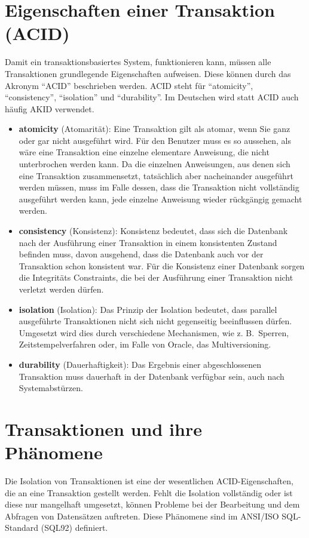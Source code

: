     \section{Eigenschaften einer Transaktion (ACID)}
      Damit ein transaktionsbasiertes System, funktionieren kann, müssen alle
      Transaktionen grundlegende Eigenschaften aufweisen. Diese können durch das Akronym
      \enquote{ACID} beschrieben werden. ACID steht für \enquote{atomicity},
     \enquote{consistency}, \enquote{isolation} und \enquote{durability}. Im
     Deutschen wird statt ACID auch häufig AKID verwendet.
      \begin{itemize}
        \item \textbf{atomicity} (Atomarität): Eine Transaktion gilt als
        atomar, wenn Sie ganz oder gar nicht ausgeführt wird. Für den
        Benutzer muss es so aussehen, als wäre eine Transaktion eine einzelne
        elementare Anweisung, die nicht unterbrochen werden kann. Da die
        einzelnen Anweisungen, aus denen sich eine Transaktion zusammensetzt,
        tatsächlich aber nacheinander ausgeführt werden müssen, muss im
        Falle dessen, dass die Transaktion nicht vollständig ausgeführt
        werden kann, jede einzelne Anweisung wieder rückgängig gemacht
        werden.
        \item \textbf{consistency} (Konsistenz): Konsistenz bedeutet, dass sich die Datenbank nach der Aus\-füh\-rung einer Transaktion in einem konsistenten Zustand befinden muss, davon ausgehend, dass die Datenbank auch vor der Transaktion schon konsistent war. Für die Konsistenz einer Datenbank sorgen die Integritäts Constraints, die bei der Ausführung einer Transaktion nicht verletzt werden dürfen.
        \item \textbf{isolation} (Isolation): Das Prinzip der Isolation
        bedeutet, dass parallel ausgeführte Transaktionen nicht sich nicht       
        gegenseitig beeinflussen dürfen. Umgesetzt wird dies durch
        verschiedene Mechanismen, wie z. B.~Sperren, Zeitstempelverfahren oder,
        im Falle von Oracle, das Multiversioning.
        \item \textbf{durability} (Dauerhaftigkeit): Das Ergebnis einer
        abgeschlossenen Transaktion muss dauerhaft in der Datenbank verfügbar
        sein, auch nach System\-ab\-stür\-zen.
      \end{itemize}
    \section{Transaktionen und ihre Phänomene}
      Die Isolation von Transaktionen ist eine der wesentlichen ACID-Eigenschaften, die an eine Transaktion gestellt werden. Fehlt die Isolation vollständig oder ist diese nur mangelhaft umgesetzt, können Probleme bei der Bearbeitung und dem Abfragen von Datensätzen auftreten. Diese Phänomene sind im ANSI/ISO SQL-Standard (SQL92) definiert.
